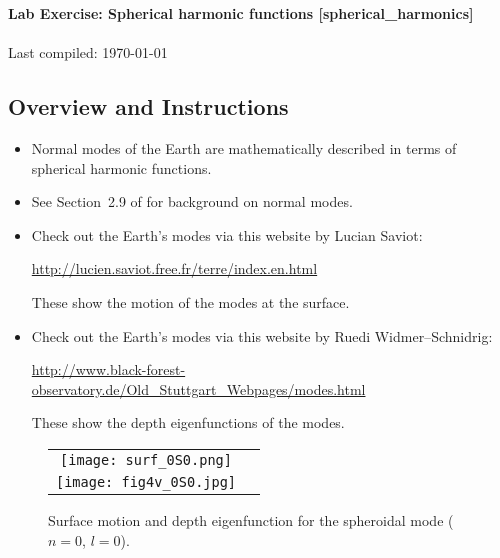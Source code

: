 \documentclass[11pt,titlepage,fleqn]{article}
\begin{document}

\begin{spacing}{1.2} 
\centering
{\large \bf Lab Exercise: Spherical harmonic functions [spherical\_harmonics]} \\
\cltag\ \\
Last compiled: \today
\end{spacing}

\subsection*{Overview and Instructions}

\begin{itemize}
\item Normal modes of the Earth are mathematically described in terms of spherical harmonic functions.

\item See Section~2.9 of \citet{SteinWysession} for background on normal modes.

\item Check out the Earth's modes via this website by Lucian Saviot:

\url{http://lucien.saviot.free.fr/terre/index.en.html}

These show the motion of the modes at the surface.

\item Check out the Earth's modes via this website by Ruedi Widmer--Schnidrig:

\url{http://www.black-forest-observatory.de/Old_Stuttgart_Webpages/modes.html}

These show the depth eigenfunctions of the modes.

\end{itemize}


\begin{figure}[h]
\centering
\begin{tabular}{cc}
\texttt{[image: surf\_0S0.png]} \\
\texttt{[image: fig4v\_0S0.jpg]} 
\end{tabular}
\caption[]
{{
Surface motion and depth eigenfunction for the spheroidal mode  ($n=0$, $l=0$).
}}
\label{fig:ex}
\end{figure}

\end{document}
